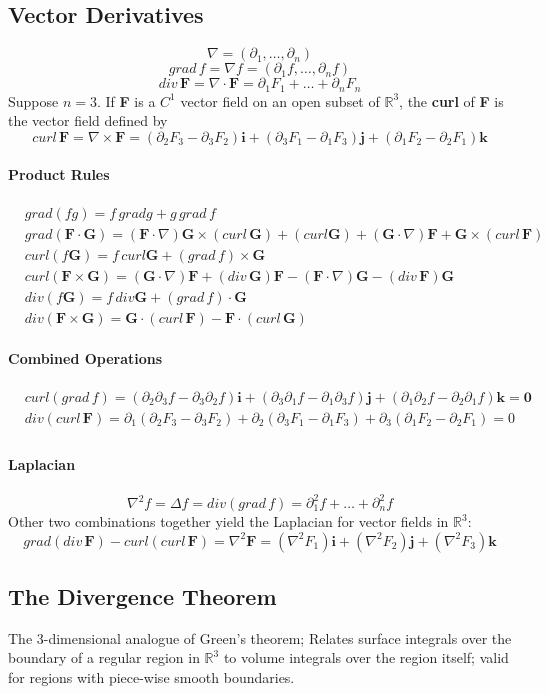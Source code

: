\documentclass[11pt]{article}
\newcommand{\tb}[1]{\textbf{#1}}
\newcommand{\real}[0]{\mathbb{R}}
\newcommand{\vo}[0]{\tb{0}}
\newcommand{\vf}[0]{\tb{F}}
\newcommand{\vi}[0]{\tb{i}}
\newcommand{\vj}[0]{\tb{j}}
\newcommand{\vk}[0]{\tb{k}}
\newcommand{\vg}[0]{\tb{G}}
\newcommand{\p}[0]{\partial}
\begin{document}
\subsection{Vector Derivatives}
$$\nabla = (\partial_1,\hdots,\partial_n)$$
$$grad\,f = \nabla f = (\partial_1 f, \hdots, \partial_n f)$$
$$div \, \tb{F} = \nabla \cdot \tb{F} = \partial_1 F_1 + \hdots+\partial_n F_n$$
Suppose $n = 3$. If \tb{F} is a $C^1$ vector field on an open subset of $\real^3$, the \tb{curl} of \tb{F} is the vector field defined by
$$curl\, \tb{F} = \nabla \times \vf = (\partial_2F_3 - \partial_3F_2)\vi +(\partial_3F_1 - \partial_1F_3)\vj + (\partial_1F_2 - \partial_2F_1)\vk$$
\paragraph{Product Rules}
\begin{align}
	&grad(fg)=f\,grad g + g\,grad\,f\\
	&grad(\vf \cdot \tb{G}) = (\vf \cdot \nabla)\vg \times (curl \, \vg) + (curl \vg) + (\vg \cdot \nabla)\vf + \vg \times (curl\, \vf)\\
	&curl(f\vg)=f\,curl\vg+(grad\,f)\times \vg\\
	&curl(\vf \times \vg) = (\vg \cdot \nabla)\vf + (div \, \vg)\vf - (\vf \cdot \nabla)\vg - (div \,\vf)\vg\\
	&div(f\vg)=f\,div\vg+(grad\,f)\cdot\vg\\
	&div(\vf\times\vg)=\vg \cdot (curl\,\vf) - \vf\cdot(curl\,\vg)
\end{align}
\paragraph{Combined Operations}
\begin{align}
	&curl(grad\,f) = (\p_2\p_3f-\p_3\p_2f)\vi+(\p_3\p_1f-\p_1\p_3f)\vj+(\p_1\p_2f-\p_2\p_1f)\vk = \vo\\
	&div(curl\,\vf) = \p_1(\p_2F_3 - \p_3F_2)+\p_2(\p_3F_1-\p_1F_3)+\p_3(\p_1F_2-\p_2F_1) = 0\\
\end{align}
\paragraph{Laplacian}
$$\nabla^2f=\Delta f = div(grad\,f) = \p_1^2f + \hdots + \p_n^2f$$
Other two combinations together yield the Laplacian for vector fields in $\real^3$:
$$grad(div\,\vf)-curl(curl\,\vf) = \nabla^2\vf = (\nabla^2F_1)\vi + (\nabla^2F_2)\vj + (\nabla^2F_3)\vk$$
\subsection{The Divergence Theorem}
The 3-dimensional analogue of Green's theorem; Relates surface integrals over the boundary of a regular region in $\real^3$ to volume integrals over the region itself; valid for regions with piece-wise smooth boundaries.
\end{document}
